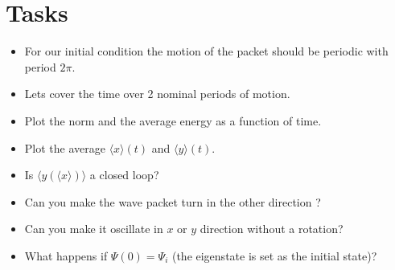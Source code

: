 \documentclass[10pt,a4paper]{article}
\begin{document}
\section*{Tasks}
\begin{itemize}
\item For our initial condition the motion of the packet should be periodic with period ${2\pi}$. 
\item Lets cover the time over 2 nominal periods of motion. 
\item 
Plot the norm and the average energy as a function of time. 
\item Plot the average $\langle x \rangle (t)$ and $\langle y\rangle (t)$. 
\item Is $\langle y (\langle x\rangle ) \rangle$ a closed loop? 
\item Can you make the wave packet turn in the other direction ?
\item Can you make it oscillate in $x$ or $y$ direction without a rotation?
\item What happens if $\Psi(0)=\Psi_i$ (the eigenstate is set as the initial state)?
\end{itemize}
\end{document}
